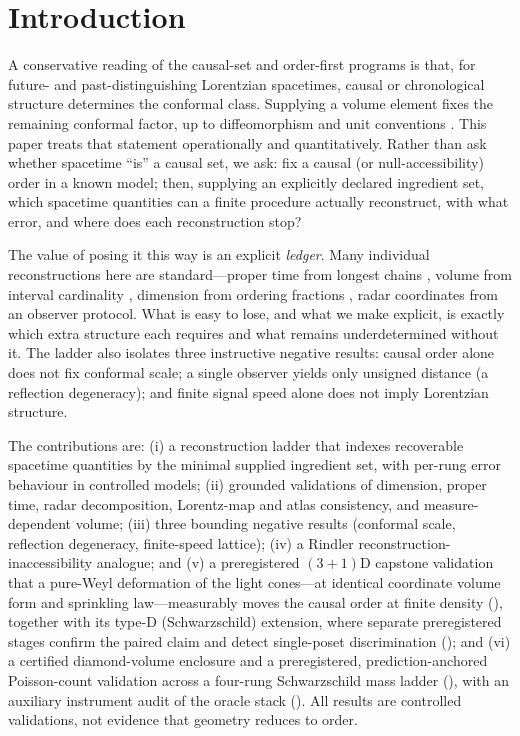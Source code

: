\section{Introduction}\label{sec:intro}

A conservative reading of the causal-set and order-first programs is that,
for future- and past-distinguishing Lorentzian spacetimes, causal or
chronological structure determines the conformal class. Supplying a volume
element fixes the remaining conformal factor, up to diffeomorphism and unit
conventions \cite{blms1987,malament1977,hkm1976,kronheimer1967,sorkin2005,surya2019}.
This paper treats that statement operationally and quantitatively. Rather
than ask whether spacetime ``is'' a causal set, we ask: fix a causal (or
null-accessibility) order in a known model; then, supplying an explicitly
declared ingredient set, which spacetime quantities can a finite procedure
actually reconstruct, with what error, and where does each reconstruction
stop?

The value of posing it this way is an explicit \emph{ledger}. Many
individual reconstructions here are standard---proper time from longest
chains \cite{brightwell1991}, volume from interval cardinality
\cite{blms1987}, dimension from ordering fractions \cite{myrheim1978,meyer1988},
radar coordinates from an observer protocol. What is easy to lose, and what
we make explicit, is exactly which extra structure each requires and what
remains underdetermined without it. The ladder also isolates three
instructive negative results: causal order alone does not fix conformal
scale; a single observer yields only unsigned distance (a reflection
degeneracy); and finite signal speed alone does not imply Lorentzian
structure.

The contributions are: (i) a reconstruction ladder that indexes recoverable
spacetime quantities by the minimal supplied ingredient set, with per-rung
error behaviour in controlled models; (ii) grounded validations of dimension,
proper time, radar decomposition, Lorentz-map and atlas consistency, and
measure-dependent volume; (iii) three bounding negative results (conformal
scale, reflection degeneracy, finite-speed lattice); (iv) a Rindler
reconstruction-inaccessibility analogue; and (v) a preregistered
$(3{+}1)$D capstone validation that a pure-Weyl deformation of the light
cones---at identical coordinate volume form and sprinkling law---measurably
moves the causal order at finite density (), together
with its type-D (Schwarzschild) extension, where separate preregistered
stages confirm the paired claim and detect single-poset discrimination
(); and (vi) a certified diamond-volume enclosure
and a preregistered, prediction-anchored Poisson-count validation across a
four-rung Schwarzschild mass ladder (), with an auxiliary
instrument audit of the oracle stack (). All results are
controlled validations, not evidence that geometry reduces to order.

